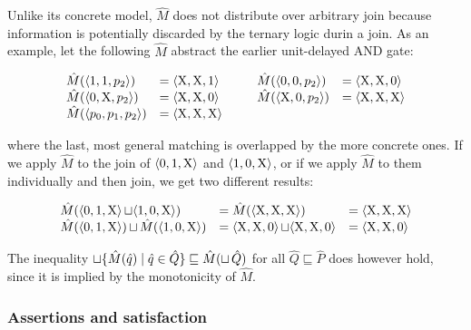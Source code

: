 Unlike its concrete model, $\hat M$ does not distribute over arbitrary join because information is potentially discarded by the ternary logic durin a join. As an example, let the following $\hat M$ abstract the earlier unit-delayed AND gate:


\begin{equation*}
\begin{array}{llll}
  \hat M(\langle 1, 1, p_{2} \rangle) & = \langle \mathrm{X}, \mathrm{X}, 1 \rangle \qquad & \hat M(\langle 0, 0, p_{2} \rangle) & = \langle \mathrm{X}, \mathrm{X}, 0 \rangle \\
  \hat M(\langle 0, \mathrm{X}, p_{2} \rangle) & = \langle \mathrm{X}, \mathrm{X}, 0 \rangle & \hat M(\langle \mathrm{X}, 0, p_{2} \rangle) & = \langle \mathrm{X}, \mathrm{X}, \mathrm{X} \rangle \\
  \hat M(\langle p_{0}, p_{1}, p_{2} \rangle) & = \langle \mathrm{X}, \mathrm{X}, \mathrm{X} \rangle & &
\end{array}
\end{equation*}


\noindent where the last, most general matching is overlapped by the more concrete ones. If we apply $\hat M$ to the join of $\langle 0, 1, \mathrm{X} \rangle$ and $\langle 1, 0, \mathrm{X} \rangle$, or if we apply $\hat M$ to them individually and then join, we get two different results:

\begin{equation*}
\begin{array}{lll}
  \hat M(\langle 0, 1, \mathrm{X} \rangle \operatorname{\sqcup} \langle 1, 0, \mathrm{X} \rangle) &= \hat M(\langle \mathrm{X}, \mathrm{X}, \mathrm{X} \rangle) &= \langle \mathrm{X}, \mathrm{X}, \mathrm{X} \rangle \\
  \hat M(\langle 0, 1, \mathrm{X} \rangle) \operatorname{\sqcup} \hat M(\langle 1, 0, \mathrm{X} \rangle) &= \langle \mathrm{X}, \mathrm{X}, 0 \rangle \operatorname{\sqcup} \langle \mathrm{X}, \mathrm{X}, 0 \rangle &= \langle \mathrm{X}, \mathrm{X}, 0 \rangle
\end{array}
\end{equation*}

\noindent The inequality $\operatorname{\sqcup} \{ \hat M(\hat q) \mid \hat q \in \hat Q \} \sqsubseteq \hat M(\operatorname{\sqcup} \hat Q)$ for all $\hat Q \sqsubseteq \hat P$ does however hold, since it is implied by the monotonicity of $\hat M$.

\subsubsection{Assertions and satisfaction}

